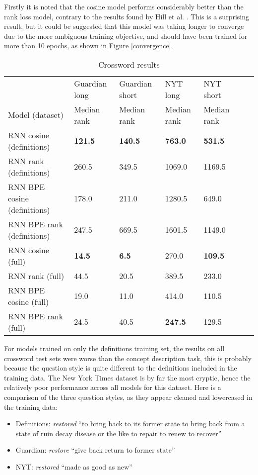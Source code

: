 \documentclass[11pt]{article}
\begin{document}
\begin{spacing}{1}
Firstly it is noted that the cosine model performs considerably better than the rank loss model, contrary to the results found by Hill et al. \citeyear{hill2015learning}. This is a surprising result, but it could be suggested that this model was taking longer to converge due to the more ambiguous training objective, and should have been trained for more than 10 epochs, as shown in Figure \ref{convergence}. 


\begin{table}[!htbp]
\caption{Crossword results}
\begin{tabular}{l|ll|llll}
\toprule
                             & Guardian long  & Guardian short & NYT long        & NYT short      \\
Model (dataset)              & Median rank    & Median rank    & Median rank     & Median rank    \\\midrule
RNN cosine (definitions)     & \textbf{121.5}          & \textbf{140.5}          & \textbf{763.0}          & \textbf{531.5}          \\
RNN rank (definitions)       & 260.5          & 349.5         & 1069.0          & 1169.5         \\
RNN BPE cosine (definitions) & 178.0 & 211.0 & 1280.5 & 649.0 \\
RNN BPE rank (definitions)   & 247.5          & 669.5          & 1601.5          & 1149.0         \\\midrule
RNN cosine (full)            &\textbf{14.5}&\textbf{6.5}&270.0&\textbf{109.5}\\
RNN rank (full)              &44.5&20.5&389.5&233.0\\
RNN BPE cosine (full)        &19.0&11.0&414.0&110.5\\
RNN BPE rank (full)          &24.5&40.5&\textbf{247.5}&129.5
\end{tabular}
\label{crossword_results}
\end{table}

For models trained on only the definitions training set, the results on all crossword test sets were worse than the concept description task, this is probably because the question style is quite different to the definitions included in the training data. The New York Times dataset is by far the most cryptic, hence the relatively poor performance across all models for this dataset. Here is a comparison of the three question styles, as they appear cleaned and lowercased in the training data: 

\begin{itemize}
\item Definitions: \textit{restored} ``to bring back to its former state to bring back from a state of ruin decay disease or the like to repair to renew to recover''
\item Guardian: \textit{restore} ``give back return to former state'' 
\item NYT: \textit{restored} ``made as good as new''
\end{itemize}


\end{spacing}
\end{document}
